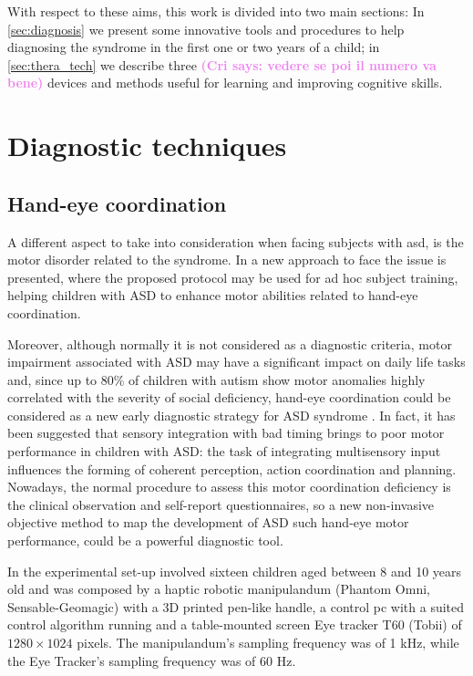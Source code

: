 \documentclass[12pt,journal,draftclsnofoot,onecolumn]{IEEEtran}
\makeatletter
\let\origsubsubsection\subsubsection
\renewcommand\subsubsection{\@ifstar{\starsubsubsection}{\nostarsubsubsection}}
\newcommand\nostarsubsubsection[1]
{\subsubsectionprelude\origsubsubsection{#1}}
\newcommand\subsubsectionprelude{%
  \vspace{6pt}
}
\newcommand{\cri}[1]{\textcolor{violet}{\textbf{(Cri says: #1)}}}
\makeatother
\begin{document}
With respect to these aims, this work is divided into two main sections: In \autoref{sec:diagnosis} we present some innovative tools and procedures to help diagnosing the syndrome in the first one or two years of a child; in \autoref{sec:thera_tech} we describe three \cri{vedere se poi il numero va bene} devices and methods useful for learning and improving cognitive skills.

\section{Diagnostic techniques}
\label{sec:diagnosis}

\subsection{Hand-eye coordination}
\label{sec:hand_eye}
A different aspect to take into consideration when facing subjects with \gls{asd}, is the motor disorder related to the syndrome. In \cite{Casellato2017} a new approach to face the issue is presented, where the proposed protocol may be used for ad hoc subject training, helping children with ASD to enhance motor abilities related to hand-eye coordination.

Moreover, although normally it is not considered as a diagnostic criteria, motor impairment associated with ASD may have a significant impact on daily life tasks and, since up to 80\% of children with autism show motor anomalies highly correlated with the severity of social deficiency, hand-eye coordination could be considered as a new early diagnostic strategy for ASD syndrome \cite{Casellato2017}. In fact, it has been suggested that sensory integration with bad timing brings to poor motor performance in children with ASD: the task of integrating multisensory input influences the forming of coherent perception, action coordination and planning. Nowadays, the normal procedure to assess this motor coordination deficiency is the clinical observation and self-report questionnaires, so a new non-invasive objective method to map the development of ASD such hand-eye motor performance, could be a powerful diagnostic tool.

\subsubsection{Material and methods}
In \cite{Casellato2017} the experimental set-up involved sixteen children aged between 8 and 10 years old and was composed by a haptic robotic manipulandum (Phantom Omni, Sensable-Geomagic) with a 3D printed pen-like handle, a control pc with a suited control algorithm running and a table-mounted screen Eye tracker T60 (Tobii) of $1280\times1024$ pixels. The manipulandum's sampling frequency was of 1 kHz, while the Eye Tracker's sampling frequency was of 60 Hz.
\end{document}
